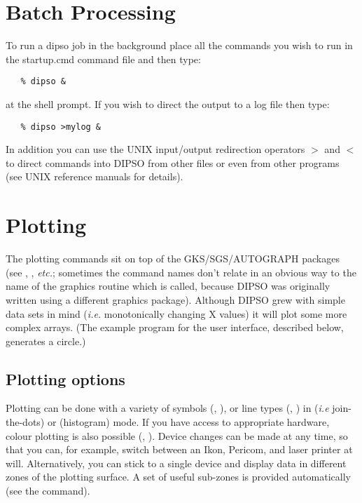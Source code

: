 \section {Batch Processing}

To run a dipso job in the background place all the commands you wish
to run in the startup.cmd command file and then type:

\begin{verbatim}
   % dipso &
\end{verbatim}

at the shell prompt. If you wish to direct the output to a log file
then type:

\begin{verbatim}
   % dipso >mylog &
\end{verbatim}

In addition you can use the UNIX input/output redirection operators
\(>\) and \(<\) to direct commands into DIPSO from other files or even
from other programs (see UNIX reference manuals for details).

\section {Plotting}

The plotting commands sit on top of the GKS/SGS/AUTOGRAPH packages (see
, , {\em etc.}; sometimes the
command names don't relate in an obvious way to the name of the graphics
routine which is called, because DIPSO was originally written using a
different graphics package). Although DIPSO grew with simple data sets in
mind ({\em i.e.} monotonically changing X values) it will plot some more
complex arrays. (The example program for the user interface, described
below, generates a circle.)

\subsection {Plotting options}

Plotting can be done with a variety of symbols (,  ), 
or line types (,  )  in   ({\em i.e}
join-the-dots) or   (histogram) mode. If you have access to
appropriate hardware, colour plotting is also possible (, 
).  Device changes can be made at any time, so that you can, for
example, switch between an Ikon, Pericom, and laser printer at will.
Alternatively, you can stick to a single device and display data in
different zones of the plotting surface. A set of useful sub-zones is
provided automatically (see the   command).

